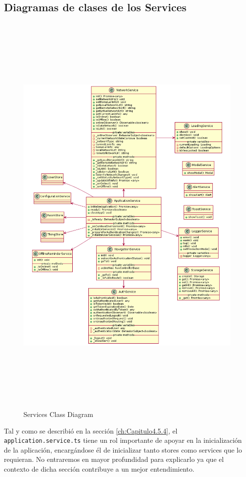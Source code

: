 \subsection{Diagramas de clases de los Services}
\label{ch:Capitulo4.5.6}

\begin{figure}[hbt!]
\centering
\includegraphics[height=8.2in]{figures/diagrams/front/architecture/services.png}
\caption[services]{Services Class Diagram\footnotemark}
\end{figure}

Tal y como se describió en la sección \ref{ch:Capitulo4.5.4}, el \verb|application.service.ts| tiene un rol importante de apoyar en la inicialización de la aplicación, encargándose él de inicializar tanto stores como services que lo requieran. No entraremos en mayor profundidad para explicarlo ya que el contexto de dicha sección contribuye a un mejor entendimiento.

